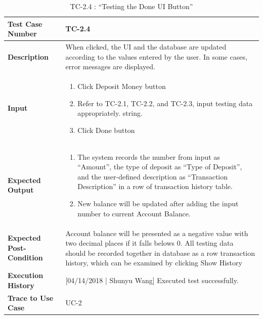\documentclass[12pt]{article}
\begin{document}
\begin{table}[H]
\caption{TC-2.4 : “Testing the Done UI Button”}
\begin{center}
\begin{tabular}{|p{5.5	cm}|p{11cm}|}
\hline
\bf Test Case Number & 
TC-2.4 \\
\hline
\bf Description & 
When clicked, the UI and the database are updated according to the values entered by the user. In some cases, error messages are displayed.\\
\hline
\bf Input & 
\begin{enumerate}
  \item Click Deposit Money button
  \item Refer to TC-2.1, TC-2.2, and TC-2.3, input testing data appropriately. string.
  \item Click Done button
\end{enumerate} \\
\hline
\bf Expected Output & 
\begin{enumerate}
  \item The system records the number from input as “Amount”, the type of deposit as “Type of Deposit”, and the user-defined description as “Transaction Description” in a row of transaction history table.
  \item New balance will be updated after adding the input number to current Account Balance.
\end{enumerate} \\
\hline
\bf Expected Post-Condition & 
Account balance will be presented as a negative value with two decimal places if it falls belows 0. All testing data should be recorded together  in database as a row transaction history, which can be examined by clicking Show History\\
\hline
\bf Execution History & 
[04/14/2018 | Shunyu Wang] Executed test successfully.\\
\hline
\bf Trace to Use Case & 
UC-2\\
\hline

\end{tabular}
\end{center}
\end{table}
\end{document}
